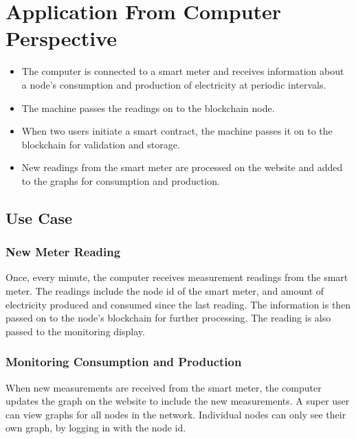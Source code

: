 \section{Application From Computer Perspective}
\begin{itemize}
\item The computer is connected to a smart meter and receives information about a node's consumption and production of electricity at periodic intervals. 
\item The machine passes the readings on to the blockchain node. 
\item When two users initiate a smart contract, the machine passes it on to the blockchain for validation and storage.
\item New readings from the smart meter are processed on the website and added to the graphs for consumption and production.
\end{itemize}

\subsection{Use Case}
\subsubsection*{New Meter Reading}
Once, every minute, the computer receives measurement readings from the smart meter. The readings include the node id of the smart meter, and amount of electricity produced and consumed since the last reading. The information is then passed on to the node's blockchain for further processing. The reading is also passed to the monitoring display.

\subsubsection*{Monitoring Consumption and Production}
When new measurements are received from the smart meter, the computer updates the graph on the website to include the new measurements. A super user can view graphs for all nodes in the network. Individual nodes can only see their own graph, by logging in with the node id.


